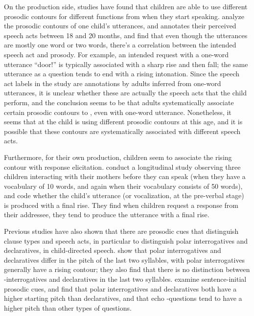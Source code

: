 On the production side, studies have found that children are able to use different prosodic contours for different functions from when they start speaking. \textcite{menyuk1969prosody} analyze the prosodic contours of one child's utterances, and annotates their perceived speech acts between 18  and 20 months, and find that even though the utterances are mostly one word or two words, there's a correlation between the intended speech act and prosody. For example, an intended request with a one-word utterance ``door!'' is typically associated with a sharp rise and then fall; the same utterance as a question tends to end with a rising intonation. Since the speech act labels in the study are annotations by adults inferred from one-word utterances, it is unclear whether these are actually the speech acts that the child perform, and the conclusion seems to be that adults systematically associate certain prosodic contours to \aqrs{}, even with one-word utterance. Nonetheless, it seems that at the child is using different prosodic contours at this age, and it is possible that these contours are systematically associated with different speech acts. 

Furthermore, for their own production, children seem to associate the rising contour with response elicitation. \textcite{flax1991prosody} conduct a longitudinal study observing three children interacting with their mothers before they can speak (when they have a vocabulary of 10 words, and again when their vocabulary consists of 50 words), and code whether the child's utterance (or vocalization, at the pre-verbal stage) is produced with a final rise. They find when children request a response from their addressee, they tend to produce the utterance with a final rise. 

Previous studies have also shown that there are prosodic cues that distinguish clause types and speech acts, in particular to distinguish polar interrogatives and declaratives, in child-directed speech. \textcite{geffenmintz2017final} show that polar interrogatives and declaratives differ in the pitch of the last two syllables, with polar interrogatives generally have a rising contour; they also find that there is no distinction between \twh-interrogatives and declaratives in the last two syllables. \textcite{chianggeffenmintz2018initial} examine sentence-initial prosodic cues, and find that polar interrogatives and declaratives both have a higher starting pitch than declaratives, and that echo \twh-questions tend to have a higher pitch than other types of questions. %


